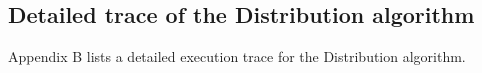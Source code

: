 	
	
\subsection{Detailed trace of the Distribution algorithm}

Appendix B lists a detailed execution trace for the Distribution algorithm.

%
%
%	
